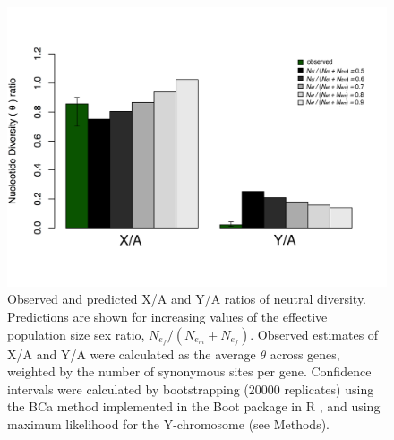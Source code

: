 \documentclass[9pt,twocolumn,twoside,lineno]{gsajnl}
\begin{document}
\begin{figure}[htbp]
\centering
\noindent
\includegraphics[width=\linewidth]{figure2.jpg}
\caption{Observed and predicted X/A and Y/A ratios of neutral diversity. Predictions are shown for increasing values of the effective population size sex ratio, $N_{e_{f}}/(N_{e_{m}} + N_{e_{f}})$. Observed estimates of X/A and Y/A were calculated as the average $\theta$ across genes, weighted by the number of synonymous sites per gene. Confidence intervals were calculated by bootstrapping (20000 replicates) using the BCa method \citep{efron1987better} implemented in the Boot package in R \citep{canty2012boot}, and using maximum likelihood for the Y-chromosome (see Methods).
}
\label{fig:ratios}
\end{figure}
\end{document}
